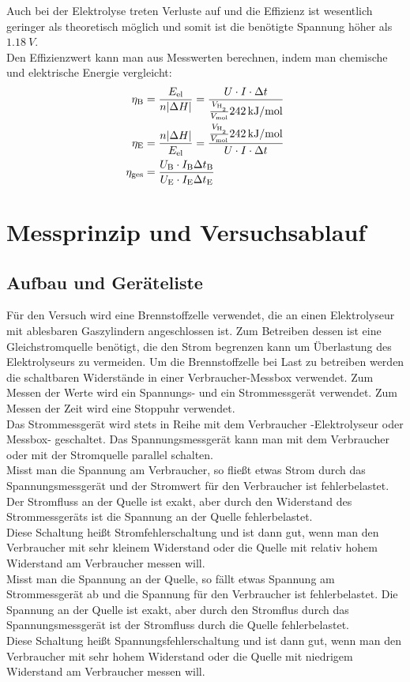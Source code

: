 \documentclass[a4paper,12pt,bibtotocnumbered]{scrartcl}
\numberwithin{equation}{section} %
\begin{document}
Auch bei der Elektrolyse treten Verluste auf und die Effizienz ist wesentlich geringer als theoretisch möglich und somit ist die benötigte Spannung höher als $\SI{1,18}{V}$.\\
Den Effizienzwert kann man aus Messwerten berechnen, indem man chemische und elektrische Energie vergleicht:
\begin{align}
\eta_\text{B} &= \frac{E_\text{el}}{n |\Delta H|} = \frac{U\cdot I\cdot \Delta t}{ \frac{V_{\ce{H_2}}}{V_{\si{mol}}} \SI{242}{kJ\per mol}}\\
\eta_\text{E} &= \frac{n |\Delta H|}{E_\text{el}} = \frac{ \frac{V_{\ce{H_2}}}{V_{\si{mol}}} \SI{242}{kJ\per mol}}{U\cdot I\cdot \Delta t}\\
\eta_\text{ges}&=\frac{U_\text{B} \cdot I_\text{B} \Delta t_\text{B}}{U_\text{E} \cdot I_\text{E} \Delta t_\text{E}}
\end{align}

\section[Messprinzip]{Messprinzip und Versuchsablauf}

\subsection{Aufbau und Geräteliste}
Für den Versuch wird eine Brennstoffzelle verwendet, die an einen Elektrolyseur mit ablesbaren Gaszylindern angeschlossen ist. Zum Betreiben dessen ist eine  Gleichstromquelle benötigt, die den Strom begrenzen kann um Überlastung des Elektrolyseurs zu vermeiden. Um die Brennstoffzelle bei Last zu betreiben werden die schaltbaren Widerstände in einer Verbraucher-Messbox verwendet. Zum Messen der Werte wird ein Spannungs- und ein Strommessgerät verwendet. Zum Messen der Zeit wird eine Stoppuhr verwendet.\\
Das Strommessgerät wird stets in Reihe mit dem Verbraucher -Elektrolyseur oder Messbox- geschaltet. Das Spannungsmessgerät kann man mit dem Verbraucher oder mit der Stromquelle parallel schalten. \\
Misst man die Spannung am Verbraucher, so fließt etwas Strom durch das Spannungsmessgerät und der Stromwert für den Verbraucher ist fehlerbelastet. Der Stromfluss an der Quelle ist exakt, aber durch den Widerstand des Strommessgeräts ist die Spannung an der Quelle fehlerbelastet. \\
Diese Schaltung heißt Stromfehlerschaltung und ist dann gut, wenn man den Verbraucher mit sehr kleinem Widerstand oder die Quelle mit relativ hohem Widerstand am Verbraucher messen will.\\
Misst man die Spannung an der Quelle, so fällt etwas Spannung am Strommessgerät ab und die Spannung für den Verbraucher ist fehlerbelastet. Die Spannung an der Quelle ist exakt, aber durch den Stromflus durch das Spannungsmessgerät ist der Stromfluss durch die Quelle fehlerbelastet. \\
Diese Schaltung heißt Spannungsfehlerschaltung und ist dann gut, wenn man den Verbraucher mit sehr hohem Widerstand oder die Quelle mit niedrigem Widerstand am Verbraucher messen will.\\
\end{document}
